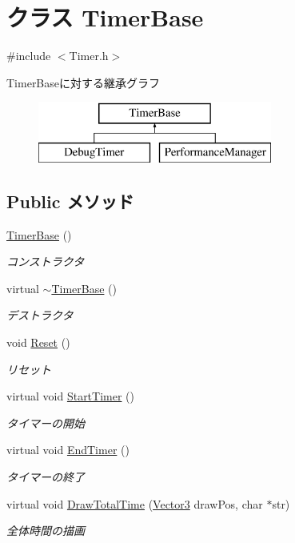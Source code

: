 \hypertarget{class_timer_base}{\section{クラス Timer\-Base}
\label{class_timer_base}
}


{\ttfamily \#include $<$Timer.\-h$>$}

Timer\-Baseに対する継承グラフ\begin{figure}[H]
\begin{center}
\leavevmode
\includegraphics[height=2.000000cm]{da/d69/class_timer_base}
\end{center}
\end{figure}
\subsection*{Public メソッド}
\begin{DoxyCompactItemize}
\item 
\hyperlink{class_timer_base_a720d9300e0c765eb60dadcaaee4bf5ed}{Timer\-Base} ()
\begin{DoxyCompactList}\small\item\em コンストラクタ \end{DoxyCompactList}\item 
virtual \hyperlink{class_timer_base_a966a6bb60939db382b264ed497d6e3ba}{$\sim$\-Timer\-Base} ()
\begin{DoxyCompactList}\small\item\em デストラクタ \end{DoxyCompactList}\item 
void \hyperlink{class_timer_base_aa47ffc6c90d8b28f87a25840ee982842}{Reset} ()
\begin{DoxyCompactList}\small\item\em リセット \end{DoxyCompactList}\item 
virtual void \hyperlink{class_timer_base_a23620639c3e82b1f61ad204e4f9b9795}{Start\-Timer} ()
\begin{DoxyCompactList}\small\item\em タイマーの開始 \end{DoxyCompactList}\item 
virtual void \hyperlink{class_timer_base_a6ea55cb2bd63da1edc94a1c9d6ac0918}{End\-Timer} ()
\begin{DoxyCompactList}\small\item\em タイマーの終了 \end{DoxyCompactList}\item 
virtual void \hyperlink{class_timer_base_a951ca2c63371cf01e281348c78725fba}{Draw\-Total\-Time} (\hyperlink{struct_vector3}{Vector3} draw\-Pos, char $\ast$str)
\begin{DoxyCompactList}\small\item\em 全体時間の描画 \end{DoxyCompactList}\end{DoxyCompactItemize}
